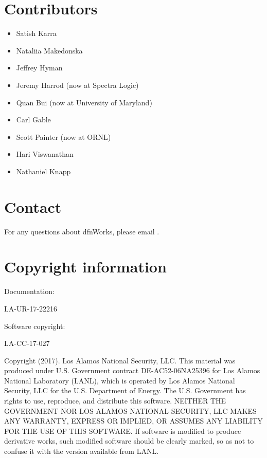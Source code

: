 \documentclass[letterpaper,10pt,english]{sphinxmanual}
\begin{document}
\section{Contributors}
\label{\detokenize{intro:contributors}}\begin{itemize}
\item {} 
Satish Karra

\item {} 
Nataliia Makedonska

\item {} 
Jeffrey Hyman

\item {} 
Jeremy Harrod (now at Spectra Logic)

\item {} 
Quan Bui (now at University of Maryland)

\item {} 
Carl Gable

\item {} 
Scott Painter (now at ORNL)

\item {} 
Hari Viswanathan

\item {} 
Nathaniel Knapp

\end{itemize}


\section{Contact}
\label{\detokenize{intro:contact}}
For any questions about dfnWorks, please email .


\section{Copyright information}
\label{\detokenize{intro:copyright-information}}
Documentation:

LA-UR-17-22216

Software copyright:

LA-CC-17-027

Copyright (2017).  Los Alamos National Security, LLC. This material was
produced under U.S. Government contract DE-AC52-06NA25396 for Los Alamos
National Laboratory (LANL), which is operated by Los Alamos National Security,
LLC for the U.S. Department of Energy. The U.S. Government has rights to use,
reproduce, and distribute this software.  NEITHER THE GOVERNMENT NOR LOS ALAMOS
NATIONAL SECURITY, LLC MAKES ANY WARRANTY, EXPRESS OR IMPLIED, OR ASSUMES ANY
LIABILITY FOR THE USE OF THIS SOFTWARE.  If software is modified to produce
derivative works, such modified software should be clearly marked, so as not
to confuse it with the version available from LANL.
\end{document}
